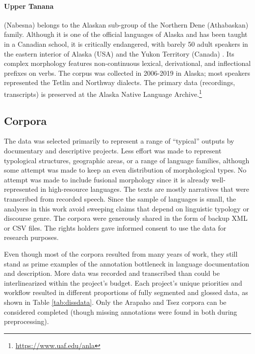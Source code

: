 \paragraph{Upper Tanana}
(Nabesna) belongs to the Alaskan sub-group of the Northern Dene (Athabaskan) family. Although it is one of the official languages of Alaska and has been taught in a Canadian school, it is critically endangered, with barely 50 adult speakers in the eastern interior of Alaska (USA) and the Yukon Territory (Canada) \citep{lovick_grammar_2020}. Its complex morphology features non-continuous lexical, derivational, and inflectional prefixes on verbs. The corpus was collected in 2006-2019 in Alaska; most speakers represented the Tetlin and Northway dialects. 
The primary data (recordings, transcripts) is preserved at the Alaska Native Language Archive.\footnote{\url{https://www.uaf.edu/anla}}



\subsection{Corpora}


The data was selected primarily to represent a range of “typical” outputs by documentary and descriptive projects. Less effort was made to represent typological structures, geographic areas, or a range of language families, although some attempt was made to keep an even distribution of morphological types. No attempt was made to include fusional morphology since it is already well-represented in high-resource languages. The texts are mostly narratives that were transcribed from recorded speech. Since the sample of languages is small, the analyses in this work avoid sweeping claims that depend on linguistic typology or discourse genre. 
The corpora were generously shared in the form of backup XML or CSV files. The rights holders gave informed consent to use the data for research purposes. 

Even though most of the corpora resulted from many years of work, they still stand as prime examples of the annotation bottleneck in language documentation and description. More data was recorded and transcribed than could be interlinearized within the project's budget. Each project's unique priorities and workflow resulted in different proportions of fully segmented and glossed data, as shown in Table \ref{tab:dissdata}.
Only the Arapaho and Tsez corpora can be considered completed (though missing annotations were found in both during preprocessing). 


